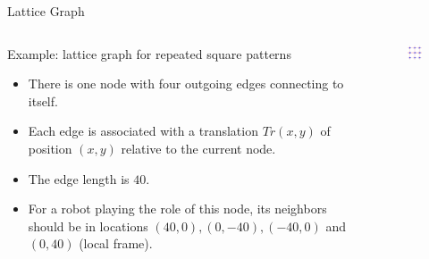 \documentclass[10pt]{beamer}
\begin{document}
\begin{frame}{Lattice Graph}
    \begin{columns}[T] %
      \begin{column}{.6\textwidth}
        \begin{block}{Example: lattice graph for repeated square patterns}
        \begin{itemize}
          \item  There is one node with four outgoing edges connecting to itself. 
          \item Each edge is associated with a translation $Tr(x, y)$
            of position $(x, y)$ relative to the current node.
          \item The edge length is $40$. 
          \item For a robot playing the role of this node, its
            neighbors should be in locations $(40, 0), (0, -40), (-40,
            0)$ and $(0, 40)$ (local frame).
          \end{itemize}
        \end{block}
      \end{column}%
      \begin{column}{.4\textwidth}
        \begin{figure}
          \centering
        \end{figure}
        \begin{figure}
          \centering
          \includegraphics[scale=1]{figs/squarelattice}
        \end{figure}
      \end{column}%
    \end{columns}
\end{frame}
\end{document}
